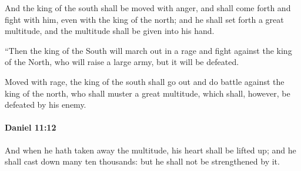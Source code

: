 			\begin{versebox}
					\item[BHS] 
					\item[LXX] 
					\item[ASV] And the king of the south shall be moved with anger, and shall come forth and fight with him, even with the king of the north; and he shall set forth a great multitude, and the multitude shall be given into his hand.
					\item[NIV] “Then the king of the South will march out in a rage and fight against the king of the North, who will raise a large army, but it will be defeated.
					\item[NRSV] Moved with rage, the king of the south shall go out and do battle against the king of the north, who shall muster a great multitude, which shall, however, be defeated by his enemy.
			\end{versebox}

		\paragraph{Daniel 11:12} %
			\label{DANIEL-11-12}

			And when he hath taken away the multitude, his heart shall be lifted up; and he shall cast down many ten thousands: but he shall not be strengthened by it.

